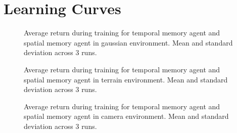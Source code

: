 \chapter{Learning Curves}
\label{app:learning}

\begin{figure}
    \centering
    
    \caption[Learning curves for gaussian environment.]{Average return during training for temporal memory agent and spatial memory agent in gaussian environment. Mean and standard deviation across 3 runs.}
    \label{fig:learning-gaussian}
\end{figure}

\begin{figure}
    \centering
    
    \caption[Learning curves for terrain environment.]{Average return during training for temporal memory agent and spatial memory agent in terrain environment. Mean and standard deviation across 3 runs.}
    \label{fig:learning-terrain}
\end{figure}

\begin{figure}
    \centering
    
    \caption[Learning curves for camera environment.]{Average return during training for temporal memory agent and spatial memory agent in camera environment. Mean and standard deviation across 3 runs.}
    \label{fig:learning-camera}
\end{figure}
